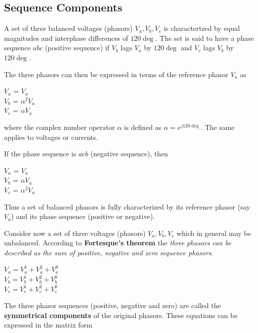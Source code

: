 \documentclass[a4paper,12pt]{article}
\begin{document}
    \pagebreak
    \subsection{Sequence Components}
    A set of three balanced voltages (phasors) $V_a, V_b, V_c$ is charactertzed by equal
    magnitudes and interphase differences of $120\deg$. The set is said to have a phase
    sequence $abc$ (positive sequence) if $V_b$ lags $V_a$ by $120\deg$ and $V_c$ lags 
    $V_b$ by $120\deg$.

    The three phasors can then be expressed in terms of the reference phasor $V_a$ as
    \begin{center}
      $V_a$ = $V_a$\\
      $V_b$ = $\alpha^2 V_a$\\
      $V_c$ = $\alpha V_a$\\
    \end{center}
    where the complex number operator $\alpha$ is defined as $\alpha = e^{j 120\deg}$.
    The same applies to voltages or currents.
    
    If the phase sequence is $acb$ (negative sequence), then
    \begin{center}
      $V_a$ = $V_a$\\
      $V_b$ = $\alpha V_a$\\
      $V_c$ = $\alpha^2 V_a$\\
    \end{center}

    Thus a set of balanced phasors is fully characterized by its reference phasor
    (say $V_a$) and its phase sequence (positive or negative).

    Consider now a set of three voltages (phasors) $V_a, V_b, V_c$ which in general may
    be unbalanced. According to {\bf Fortesque's theorem} the {\it three phasors can be
    described as the sum of positive, negative and zero sequence phasors}.

    \begin{center}
      $V_a = V_a^1 + V_a^2 + V_a^0$\\
      $V_b = V_b^1 + V_b^2 + V_b^0$\\
      $V_c = V_c^1 + V_c^2 + V_c^0$
    \end{center}

    The three phasor sequences (positive, negative and zero) are called the
    {\bf symmetrical components} of the original phasors. These equations 
    can be expressed in the matrix form
    
\end{document}
